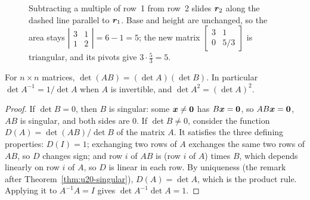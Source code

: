 \begin{figure}[ht]
  \centering
  \caption{Subtracting a multiple of row~1 from row~2 slides $\boldsymbol{r}_2$ along the dashed line
  parallel to $\boldsymbol{r}_1$. Base and height are unchanged, so the area stays
  $\left|\begin{smallmatrix}3&1\\1&2\end{smallmatrix}\right|=6-1=5$; the new matrix
  $\left[\begin{smallmatrix}3&1\\0&5/3\end{smallmatrix}\right]$ is triangular, and its pivots
  give $3\cdot\frac53=5$.}
  \label{fig:u20-shear}
\end{figure}

\begin{theorem}\label{thm:u20-product}
For $n\times n$ matrices, $\det(AB)=(\det A)(\det B)$. In particular
$\det A^{-1}=1/\det A$ when $A$ is invertible, and $\det A^2=(\det A)^2$.
\end{theorem}

\begin{proof}
If $\det B=0$, then $B$ is singular: some $\boldsymbol{x}\neq\boldsymbol{0}$ has $B\boldsymbol{x}=\boldsymbol{0}$, so
$AB\boldsymbol{x}=\boldsymbol{0}$, $AB$ is singular, and both sides are $0$. If $\det B\neq 0$, consider the
function $D(A)=\det(AB)/\det B$ of the matrix $A$. It satisfies the three defining
properties: $D(I)=1$; exchanging two rows of $A$ exchanges the same two rows of $AB$, so $D$
changes sign; and row $i$ of $AB$ is (row $i$ of $A$) times $B$, which depends linearly on row
$i$ of $A$, so $D$ is linear in each row. By uniqueness (the remark after
Theorem~\ref{thm:u20-singular}), $D(A)=\det A$, which is the product rule. Applying it to
$A^{-1}A=I$ gives $\det A^{-1}\det A=1$.
\end{proof}

